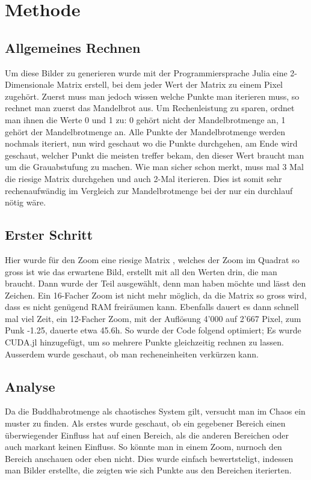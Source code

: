 \section{Methode}
\subsection{Allgemeines Rechnen}
Um diese Bilder zu generieren wurde mit der Programmiersprache Julia eine 2-Dimensionale Matrix erstell, bei dem jeder Wert der Matrix zu einem Pixel zugehört. Zuerst muss man jedoch wissen welche Punkte man iterieren muss, so rechnet man zuerst das Mandelbrot aus. Um Rechenleistung zu sparen, ordnet man ihnen die Werte 0 und 1 zu: 0 gehört nicht der Mandelbrotmenge an, 1 gehört der Mandelbrotmenge an. Alle Punkte der Mandelbrotmenge werden nochmals iteriert, nun wird geschaut wo die Punkte durchgehen, am Ende wird geschaut, welcher Punkt die meisten treffer bekam, den dieser Wert braucht man um die Grauabstufung zu machen. Wie man sicher schon merkt, muss mal 3 Mal die riesige Matrix durchgehen und auch 2-Mal iterieren. Dies ist somit sehr rechenaufwändig im Vergleich zur Mandelbrotmenge bei der nur ein durchlauf nötig wäre.
\subsection{Erster Schritt}
Hier wurde für den Zoom eine riesige Matrix , welches der Zoom im Quadrat so gross ist wie das erwartene Bild, erstellt mit all den Werten drin, die man braucht. Dann wurde der Teil ausgewählt, denn man haben möchte und lässt den Zeichen. Ein 16-Facher Zoom ist nicht mehr möglich, da die Matrix so gross wird, dass es nicht genügend RAM freiräumen kann. Ebenfalls dauert es dann schnell mal viel Zeit, ein 12-Facher Zoom, mit der Auflösung 4'000 auf 2'667 Pixel, zum Punk -1.25, dauerte etwa 45.6h. So wurde der Code folgend optimiert; Es wurde CUDA.jl hinzugefügt, um so mehrere Punkte gleichzeitig rechnen zu lassen. Ausserdem wurde geschaut, ob man recheneinheiten verkürzen kann.
\subsection{Analyse}
Da die Buddhabrotmenge als chaotisches System gilt, versucht man im Chaos ein muster zu finden. Als erstes wurde geschaut, ob ein gegebener Bereich einen überwiegender Einfluss hat auf einen Bereich, als die anderen Bereichen oder auch markant keinen Einfluss. So könnte man in einem Zoom, nurnoch den Bereich anschauen oder eben nicht. Dies wurde einfach bewertsteligt, indessen man Bilder erstellte, die zeigten wie sich Punkte aus den Bereichen iterierten. 